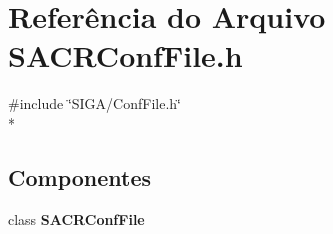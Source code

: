 \section{Referência do Arquivo S\+A\+C\+R\+Conf\+File.\+h}
\label{_s_a_c_r_conf_file_8h}
{\ttfamily \#include \char`\"{}S\+I\+G\+A/\+Conf\+File.\+h\char`\"{}}\\*
\subsection*{Componentes}
\begin{DoxyCompactItemize}
\item 
class {\bf S\+A\+C\+R\+Conf\+File}
\end{DoxyCompactItemize}
